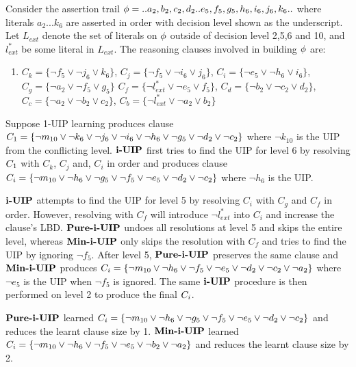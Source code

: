 \begin{example}
Consider the assertion trail $\phi = {..a_2,b_2,c_2,d_2..e_5,f_5,g_5,h_6,i_6,j_6,k_6..}$ where literals $a_2 ... k_{6}$ are asserted in order with decision level shown as the underscript. Let $L_{ext}$ denote the set of literals on $\phi$ outside of decision level 2,5,6 and 10, and $l^{*}_{ext}$ be some literal in $L_{ext}$. The reasoning clauses involved in building $\phi$ are:
\begin{enumerate}
  \item[] $C_k = \{\neg{f_5} \vee \neg{j_6} \vee k_6\}$,
  $C_j = \{\neg{f_5} \vee \neg{i_6} \vee j_6\}$, 
  $C_i = \{\neg{e_5} \vee \neg{h_6} \vee i_6\}$,
  $C_g = \{\neg{a_2} \vee \neg{f_5} \vee g_5\}$
  $C_f = \{\neg{l^{*}_{ext}} \vee \neg{e_5} \vee f_5\}$,
  $C_d = \{\neg{b_2} \vee \neg{c_2} \vee d_2\}$,
  $C_c = \{\neg{a_2} \vee \neg{b_2} \vee c_2 \}$,
  $C_b = \{\neg{l^{*}_{ext}} \vee \neg{a_2} \vee b_2\}$
\end{enumerate}
Suppose 1-UIP learning produces clause 
$C_{1} = \{\neg{m_{10}} \vee \neg{k_6} \vee \neg{j_6} \vee \neg{i_6} \vee \neg{h_6} \vee \neg{g_5} \vee \neg{d_2} \vee \neg{c_2}\}$ where $\neg{k_{10}}$ is the UIP from the conflicting level. $\textbf{i-UIP}$ first tries to find the UIP for level 6 by resolving $C_{1}$ with $C_k$, $C_j$ and, $C_i$ in order and produces clause 
$C_{i} = \{\neg{m_{10}} \vee \neg{h_6} \vee \neg{g_5} \vee \neg{f_5} \vee \neg{e_5} \vee \neg{d_2} \vee  \neg{c_2} \}$ where $\neg{h_6}$ is the UIP.

$\textbf{i-UIP}$ attempts to find the UIP for level 5 by resolving $C_i$ with 
$C_g$ and $C_f$ in order. However, resolving with $C_f$ will introduce $\neg{l^{*}_{ext}}$ into 
$C_i$ and increase the clause's LBD. $\textbf{Pure-i-UIP}$ undoes all resolutions at level 5 and skips the entire level, whereas $\textbf{Min-i-UIP}$ only skips the resolution with $C_f$ and tries to find the UIP by ignoring $\neg{f_5}$.  After level 5, $\textbf{Pure-i-UIP}$ preserves the same clause and $\textbf{Min-i-UIP}$ produces $C_{i} = \{\neg{m_{10}} \vee \neg{h_6} \vee \neg{f_5} \vee \neg{e_5} \vee \neg{d_2} \vee \neg{c_2} \vee \neg{a_2}\}$ where $\neg{e_5}$ is the UIP when $\neg{f_5}$ is ignored. The same $\textbf{i-UIP}$ procedure is then performed on level 2 to produce the final $C_{i}$. 

$\textbf{Pure-i-UIP}$ learned $C_{i} = \{\neg{m_{10}} \vee \neg{h_6} \vee \neg{g_5} \vee \neg{f_5} \vee \neg{e_5} \vee \neg{d_2} \vee  \neg{c_2} \}$ and reduces the learnt clause size by 1. $\textbf{Min-i-UIP}$ learned $C_{i} = \{\neg{m_{10}} \vee \neg{h_6} \vee \neg{f_5} \vee \neg{e_5} \vee \neg{b_2} \vee \neg{a_2}\}$ and reduces the learnt clause size by 2. 
\end{example}

